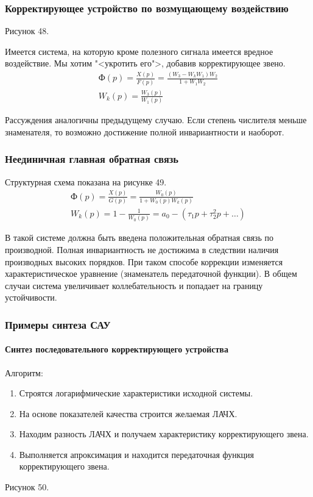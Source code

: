 \subsubsection{Корректирующее устройство по возмущающему воздействию}
Рисунок 48.

Имеется система, на которую кроме полезного сигнала имеется вредное воздействие. Мы хотим "<укротить его">, добавив корректирующее звено. 
\begin{align*}
	\text{Ф}(p)=\frac{X(p)}{F(p)}=\frac{(W_3-W_kW_1)W_2}{1+W_1W_2}\\
	W_k(p)=\frac{W_3(p)}{W_1(p)}
\end{align*}

Рассуждения аналогичны предыдущему случаю. Если степень числителя меньше знаменателя, то возможно достижение полной инвариантности и наоборот.

\subsubsection{Неединичная главная обратная связь}
Структурная схема показана на рисунке 49.
\begin{align*}
	\text{Ф}(p)=\frac{X(p)}{G(p)}=\frac{W_0(p)}{1+W_0(p)W_k(p)} \\
	W_k(p)=1-\frac1{W_0(p)}=a_0-(\tau_1p+\tau_2^2p+\ldots)
\end{align*}

В такой системе должна быть введена положительная обратная связь по производной. Полная инвариантность не достижима в следствии наличия производных высоких порядков. При таком способе коррекции изменяется характеристическое уравнение (знаменатель передаточной функции). В общем случаи система увеличивает коллебательность и попадает на границу устойчивости.

\subsubsection{Примеры синтеза САУ}
\paragraph{Синтез последовательного корректирующего устройства}
Алгоритм:
\begin{enumerate}
	\item Строятся логарифмические характеристики исходной системы.
	\item На основе показателей качества строится желаемая ЛАЧХ.
	\item Находим разность ЛАЧХ и получаем характеристику корректирующего звена.
	\item Выполняется апроксимация и находится передаточная функция корректирующего звена.
\end{enumerate}
Рисунок 50.

